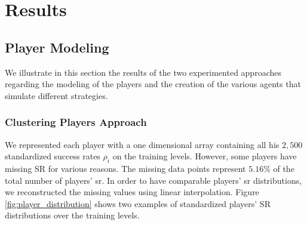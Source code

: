 \chapter{Results}
\label{chap:results}

\section{Player Modeling}
We illustrate in this section the results of the two experimented approaches regarding the modeling of the players and the creation of the various agents that simulate different strategies.

\subsection{Clustering Players Approach}
We represented each player with a one dimensional array containing all his $2,500$ standardized success rates $\rho_i$ on the training levels. However, some players have missing SR for various reasons. The missing data points represent $5.16\%$ of the total number of players' \acs{sr}. In order to have comparable players' \acs{sr} distributions, we reconstructed the missing values using linear interpolation.
Figure \ref{fig:player_distribution} shows two examples of standardized players' SR distributions over the training levels.


